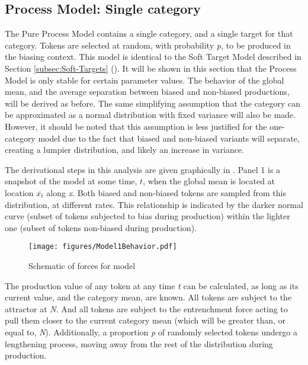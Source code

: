 \subsection{\label{subsec:Model-B:-Lengthening}Process Model: Single category}

The Pure Process Model contains a single category, and a single target
for that category. Tokens are selected at random, with probability
\emph{p,} to be produced in the biasing context. This model is identical
to the Soft Target Model described in Section \ref{subsec:Soft-Targets}
(). It will be shown in this
section that the Process Model is only stable for certain parameter
values. The behavior of the global mean, and the average separation
between biased and non-biased productions, will be derived as before.
The same simplifying assumption that the category can be approximated
as a normal distribution with fixed variance will also be made. However,
it should be noted that this assumption is less justified for the
one-category model due to the fact that biased and non-biased variants
will separate, creating a lumpier distribution, and likely an increase
in variance.

The derivational steps in this analysis are given graphically in .
Panel 1 is a snapshot of the model at some
time, \emph{$t$}, when the global mean is located at location $\overline{x_{t}}$
along \emph{x}. Both biased and non-biased tokens are sampled from
this distribution, at different rates. This relationship is indicated
by the darker normal curve (subset of tokens subjected to bias during
production) within the lighter one (subset of tokens non-biased during
production). 

\begin{figure}[h]
\texttt{[image: figures/Model1Behavior.pdf]}\caption{\label{fig:Derivation}Schematic of forces for  model}
\end{figure}

The production value of any token at any time \emph{t} can be calculated,
as long as its current value, and the category mean, are known. All
tokens are subject to the attractor at \emph{N}. And all tokens are
subject to the entrenchment force acting to pull them closer to the
current category mean (which will be greater than, or equal to, \emph{N}).
Additionally, a proportion \emph{p} of randomly selected tokens undergo
a lengthening process, moving away from the rest of the distribution
during production.

